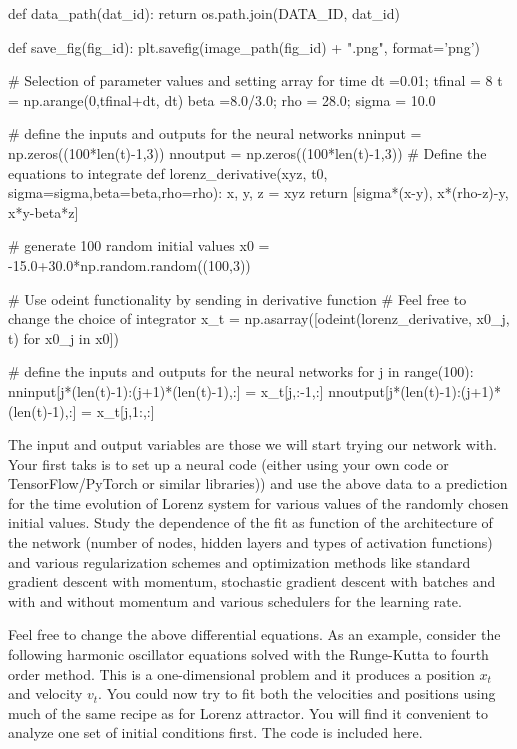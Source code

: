 \documentclass[%
oneside,                 %
final,                   %
10pt]{article}
\begin{document}
def data_path(dat_id):
    return os.path.join(DATA_ID, dat_id)

def save_fig(fig_id):
    plt.savefig(image_path(fig_id) + ".png", format='png')


# Selection of parameter values and setting array for time
dt =0.01; tfinal = 8
t = np.arange(0,tfinal+dt, dt)
beta =8.0/3.0; rho = 28.0; sigma = 10.0

# define the inputs and outputs for the neural networks
nninput = np.zeros((100*len(t)-1,3))
nnoutput = np.zeros((100*len(t)-1,3))
# Define the equations to integrate
def lorenz_derivative(xyz, t0, sigma=sigma,beta=beta,rho=rho):
    x, y, z = xyz
    return [sigma*(x-y), x*(rho-z)-y, x*y-beta*z]

# generate 100 random initial values
x0 = -15.0+30.0*np.random.random((100,3))

# Use odeint functionality by sending in derivative function
# Feel free to change the choice of integrator
x_t = np.asarray([odeint(lorenz_derivative, x0_j, t) 
                  for x0_j in x0])

# define the inputs and outputs for the neural networks
for j in range(100):
    nninput[j*(len(t)-1):(j+1)*(len(t)-1),:] = x_t[j,:-1,:]
    nnoutput[j*(len(t)-1):(j+1)*(len(t)-1),:] = x_t[j,1:,:]


\epycod


The input and output variables are those we will start trying our
network with. Your first taks is to set up a neural code (either using
your own code or TensorFlow/PyTorch or similar libraries)) and use the
above data to a prediction for the time evolution of Lorenz system for
various values of the randomly chosen initial values.  Study the
dependence of the fit as function of the architecture of the network
(number of nodes, hidden layers and types of activation functions) and
various regularization schemes and optimization methods like standard
gradient descent with momentum, stochastic gradient descent with
batches and with and without momentum and various schedulers for the
learning rate.

Feel free to change the above differential equations. As an example,
consider the following harmonic oscillator equations solved with the
Runge-Kutta to fourth order method. This is a one-dimensional problem
and it produces a position $x_t$ and velocity $v_t$. You could now try
to fit both the velocities and positions using much of the same recipe
as for Lorenz attractor.  You will find it convenient to analyze one
set of initial conditions first. The code is included here.
\end{document}
